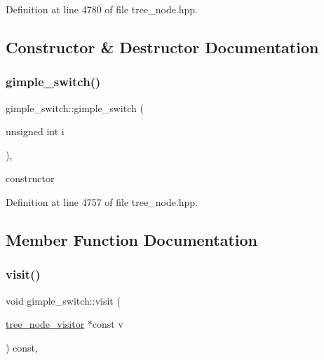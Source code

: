 Definition at line 4780 of file tree\+\_\+node.\+hpp.



\subsection{Constructor \& Destructor Documentation}
\mbox{\label{structgimple__switch_a6ba1140d8a485d211bacde46db9898b7}} 
\subsubsection{\texorpdfstring{gimple\+\_\+switch()}{gimple\_switch()}}
{\footnotesize\ttfamily gimple\+\_\+switch\+::gimple\+\_\+switch (\begin{DoxyParamCaption}\item[{unsigned int}]{i }\end{DoxyParamCaption})\hspace{0.3cm}{\ttfamily [inline]}, {\ttfamily [explicit]}}



constructor 



Definition at line 4757 of file tree\+\_\+node.\+hpp.



\subsection{Member Function Documentation}
\mbox{\label{structgimple__switch_a2fc71fef3c7d9d08e116ca7dba93d0e2}} 
\subsubsection{\texorpdfstring{visit()}{visit()}}
{\footnotesize\ttfamily void gimple\+\_\+switch\+::visit (\begin{DoxyParamCaption}\item[{\hyperlink{classtree__node__visitor}{tree\+\_\+node\+\_\+visitor} $\ast$const}]{v }\end{DoxyParamCaption}) const\hspace{0.3cm}{\ttfamily [override]}, {\ttfamily [virtual]}}




